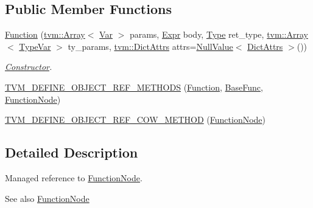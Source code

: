 \subsection*{Public Member Functions}
\begin{DoxyCompactItemize}
\item 
\hyperlink{classtvm_1_1relay_1_1Function_a4da29d04ce5fa5ab531d587cbebc358f}{Function} (\hyperlink{classtvm_1_1Array}{tvm\+::\+Array}$<$ \hyperlink{classtvm_1_1relay_1_1Var}{Var} $>$ params, \hyperlink{namespacetvm_1_1relay_a5b84e3790f89bb3fad5c7911eeb99531}{Expr} body, \hyperlink{namespacetvm_1_1relay_a661d95f170bca230773914caeef3fe52}{Type} ret\+\_\+type, \hyperlink{classtvm_1_1Array}{tvm\+::\+Array}$<$ \hyperlink{namespacetvm_1_1relay_a63321eb51080f3f57dd7563a3ca0bfa6}{Type\+Var} $>$ ty\+\_\+params, \hyperlink{classtvm_1_1DictAttrs}{tvm\+::\+Dict\+Attrs} attrs=\hyperlink{namespacetvm_ab6c242e8ac09beb463fba306948b7f15}{Null\+Value}$<$ \hyperlink{classtvm_1_1DictAttrs}{Dict\+Attrs} $>$())
\begin{DoxyCompactList}\small\item\em \hyperlink{classtvm_1_1Constructor}{Constructor}. \end{DoxyCompactList}\item 
\hyperlink{classtvm_1_1relay_1_1Function_afb025766d10255fbc8310363f320f772}{T\+V\+M\+\_\+\+D\+E\+F\+I\+N\+E\+\_\+\+O\+B\+J\+E\+C\+T\+\_\+\+R\+E\+F\+\_\+\+M\+E\+T\+H\+O\+DS} (\hyperlink{classtvm_1_1relay_1_1Function}{Function}, \hyperlink{namespacetvm_1_1relay_acbaff2ae7feec23fea55e025a9cc1b76}{Base\+Func}, \hyperlink{classtvm_1_1relay_1_1FunctionNode}{Function\+Node})
\item 
\hyperlink{classtvm_1_1relay_1_1Function_ac085d821f02ee1e2a4927f85f72f6862}{T\+V\+M\+\_\+\+D\+E\+F\+I\+N\+E\+\_\+\+O\+B\+J\+E\+C\+T\+\_\+\+R\+E\+F\+\_\+\+C\+O\+W\+\_\+\+M\+E\+T\+H\+OD} (\hyperlink{classtvm_1_1relay_1_1FunctionNode}{Function\+Node})
\end{DoxyCompactItemize}


\subsection{Detailed Description}
Managed reference to \hyperlink{classtvm_1_1relay_1_1FunctionNode}{Function\+Node}. 

\begin{DoxySeeAlso}{See also}
\hyperlink{classtvm_1_1relay_1_1FunctionNode}{Function\+Node} 
\end{DoxySeeAlso}


